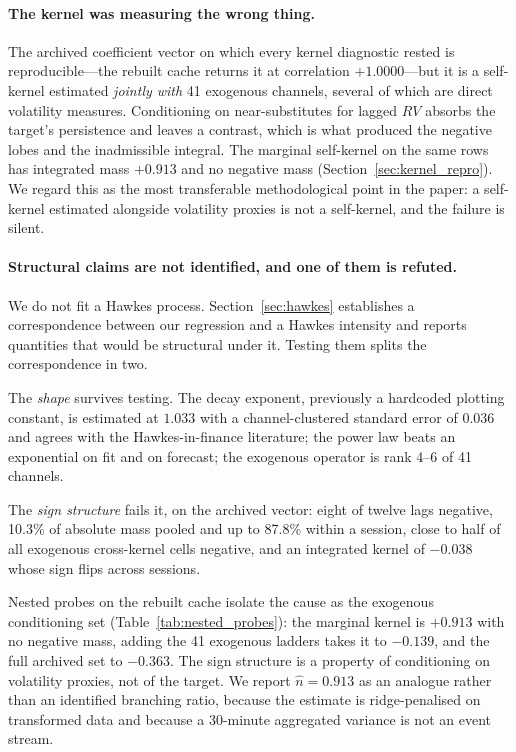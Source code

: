 \paragraph{The kernel was measuring the wrong thing.} The archived
coefficient vector on which every kernel diagnostic rested is reproducible---the
rebuilt cache returns it at correlation $+1.0000$---but it is a self-kernel
estimated \emph{jointly with} 41 exogenous channels, several of which are
direct volatility measures. Conditioning on near-substitutes for lagged $RV$
absorbs the target's persistence and leaves a contrast, which is what produced
the negative lobes and the inadmissible integral. The marginal self-kernel on
the same rows has integrated mass $+0.913$ and no negative mass
(Section~\ref{sec:kernel_repro}). We regard this as the most transferable
methodological point in the paper: a self-kernel estimated alongside volatility
proxies is not a self-kernel, and the failure is silent.

\paragraph{Structural claims are not identified, and one of them is refuted.}
We do not fit a Hawkes process. Section~\ref{sec:hawkes} establishes a
correspondence between our regression and a Hawkes intensity and reports
quantities that would be structural under it. Testing them splits the
correspondence in two.

The \emph{shape} survives testing. The decay exponent, previously a hardcoded
plotting constant, is estimated at $1.033$ with a channel-clustered standard
error of $0.036$ and agrees with the Hawkes-in-finance literature; the power
law beats an exponential on fit and on forecast; the exogenous operator is
rank 4--6 of 41 channels.

The \emph{sign structure} fails it, on the archived vector: eight of twelve
lags negative, 10.3\% of absolute mass pooled and up to 87.8\% within a
session, close to half of all exogenous cross-kernel cells negative, and an
integrated kernel of $-0.038$ whose sign flips across sessions.

Nested probes on the rebuilt cache isolate the cause as the exogenous
conditioning set (Table~\ref{tab:nested_probes}): the marginal kernel is
$+0.913$ with no negative mass, adding the 41 exogenous ladders takes it to
$-0.139$, and the full archived set to $-0.363$. The sign structure is a
property of conditioning on volatility proxies, not of the target. We report
$\hat n = 0.913$ as an analogue rather than an identified branching ratio,
because the estimate is ridge-penalised on transformed data and because a
30-minute aggregated variance is not an event stream.

